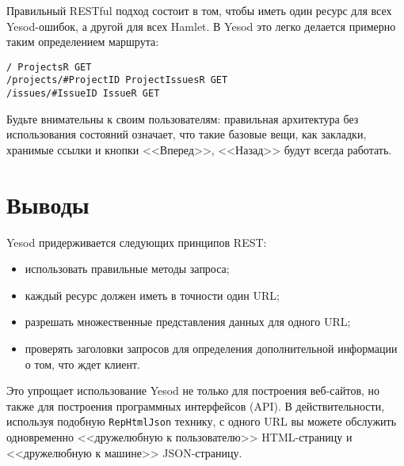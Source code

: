 Правильный RESTful подход состоит в том, чтобы иметь один ресурс для всех Yesod-ошибок,
а другой для всех Hamlet. В Yesod это легко делается примерно таким
определением маршрута:
\begin{lstlisting}
/ ProjectsR GET
/projects/#ProjectID ProjectIssuesR GET
/issues/#IssueID IssueR GET
\end{lstlisting}

Будьте внимательны к своим пользователям: правильная архитектура без использования состояний означает, что такие базовые вещи, как закладки, хранимые ссылки и кнопки <<Вперед>>, <<Назад>> будут всегда работать.

\section{Выводы}

Yesod придерживается следующих принципов REST:
\begin{itemize}
 \item использовать правильные методы запроса;
 \item каждый ресурс должен иметь в точности один URL;
 \item разрешать множественные представления данных для одного URL;
 \item проверять заголовки запросов для определения дополнительной информации о том, что
ждет клиент.
\end{itemize}

Это упрощает использование Yesod не только для построения веб-сайтов, но также для
построения программных интерфейсов (API). В действительности, используя подобную
\verb*|RepHtmlJson| технику, с одного URL вы можете обслужить одновременно <<дружелюбную к
пользователю>> HTML-страницу и <<дружелюбную к машине>> JSON-страницу.
